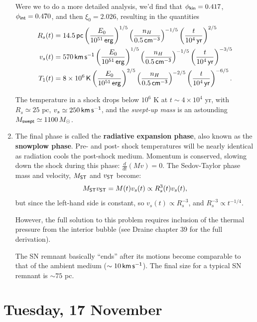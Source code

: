 \documentclass{tufte-handout}
\renewcommand{\textbf}[1]{{\bf \textcolor{dark-gray}{#1}}}
\renewcommand{\rm}{\sf}
\newcommand{\e}[1]{\times 10^{#1}}
\begin{document}
\begin{enumerate}
Were we to do a more detailed analysis, we'd find that $\phi_{\rm kin} = 0.417$, $\phi_{\rm int} = 0.470$, and then $\xi_0 = 2.026$, resulting in the quantities
\begin{align*}
R_s(t) &= 14.5 {\rm\, pc} \left (\frac{E_0}{10^{51}\, \rm erg}\right )^{1/5} \left (\frac{n_H}{0.5\,\rm cm^{-3}}\right )^{-1/5} \left (\frac{t}{10^4\,\rm yr}\right )^{2/5}\\
v_s(t) &= 570 {\rm\, km\, s^{-1}} \left (\frac{E_0}{10^{51}\, \rm erg}\right )^{1/5} \left (\frac{n_H}{0.5\,\rm cm^{-3}}\right )^{-1/5} \left (\frac{t}{10^4\,\rm yr}\right )^{-3/5}\\
T_1(t) &= 8\e{6} {\rm\, K} \left (\frac{E_0}{10^{51}\, \rm erg}\right )^{2/5} \left (\frac{n_H}{0.5\,\rm cm^{-3}}\right )^{-2/5} \left (\frac{t}{10^4\,\rm yr}\right )^{-6/5}.
\end{align*}

The temperature in a shock drops below $10^6$ K at $t \sim 4\e{4}$ yr, with $R_s \simeq 25$ pc, $v_s \simeq 250 {\rm\, km\, s^{-1}}$, and the \textit{swept-up mass} is an astounding $M_{\rm swept} \simeq 1100\, M_\odot$.


\item The final phase is called the \textbf{radiative expansion phase}, also known as the \textbf{snowplow phase}. Pre- and post- shock temperatures will be nearly identical as radiation cools the post-shock medium. Momentum is conserved, slowing down the shock during this phase: $\frac{d}{dt}(Mv) = 0$. The Sedov-Taylor phase mass and velocity, $M_{\rm ST}$ and $v_{\rm ST}$ become:
\[M_{\rm ST}v_{\rm ST} = M(t) v_s(t) \propto R_s^3(t) v_s(t),\]
but since the left-hand side is constant, so $v_s(t) \propto R_s^{-3}$, and $R_s^{-3} \propto t^{-1/4}$.

However, the full solution to this problem requires inclusion of the thermal pressure from the interior bubble (see  Draine chapter 39 for the full derivation).

The SN remnant basically ``ends'' after its motions become comparable to that of the ambient medium ($\sim 10{\rm\, km\, s^{-1}}$). The final size for a typical SN remnant is $\sim 75$ pc.
\end{enumerate}

\section{Tuesday, 17 November}
\end{document}
